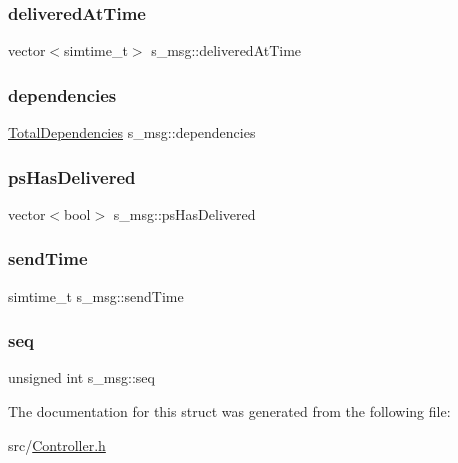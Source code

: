 \mbox{\label{structs__msg_a25acd8d8afeacf207f402c8362fe452c}} 
\subsubsection{\texorpdfstring{delivered\+At\+Time}{deliveredAtTime}}
{\footnotesize\ttfamily vector$<$simtime\+\_\+t$>$ s\+\_\+msg\+::delivered\+At\+Time}

\mbox{\label{structs__msg_a0683a931a64bb9e40c4da98dbd5bc836}} 
\subsubsection{\texorpdfstring{dependencies}{dependencies}}
{\footnotesize\ttfamily \hyperlink{class_total_dependencies}{Total\+Dependencies} s\+\_\+msg\+::dependencies}

\mbox{\label{structs__msg_ac9b1dd0616f30d1eadfdeda272e1b238}} 
\subsubsection{\texorpdfstring{ps\+Has\+Delivered}{psHasDelivered}}
{\footnotesize\ttfamily vector$<$bool$>$ s\+\_\+msg\+::ps\+Has\+Delivered}

\mbox{\label{structs__msg_abf4a4c8c468860dec56cb8d69aba81b3}} 
\subsubsection{\texorpdfstring{send\+Time}{sendTime}}
{\footnotesize\ttfamily simtime\+\_\+t s\+\_\+msg\+::send\+Time}

\mbox{\label{structs__msg_a81ee20a1e6b791fdc215d88c0418e618}} 
\subsubsection{\texorpdfstring{seq}{seq}}
{\footnotesize\ttfamily unsigned int s\+\_\+msg\+::seq}



The documentation for this struct was generated from the following file\+:\begin{DoxyCompactItemize}
\item 
src/\hyperlink{_controller_8h}{Controller.\+h}\end{DoxyCompactItemize}
